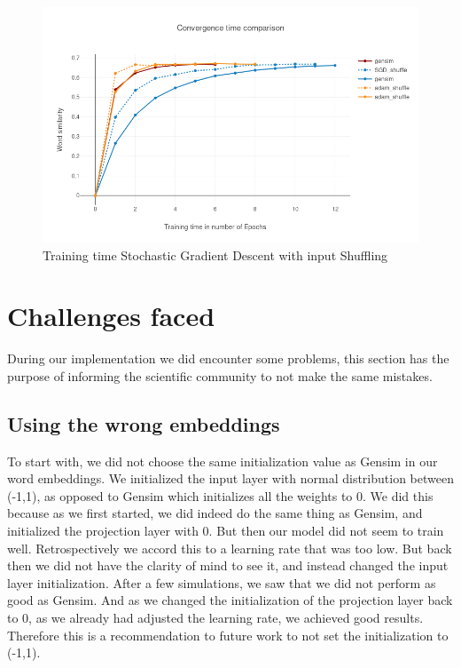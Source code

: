\begin{figure}[H]
    \centering
            \includegraphics[scale=0.45]{images/gensim_vs_adam} 
    \caption{Training time Stochastic Gradient Descent with input Shuffling}
    \label{fig:gensim_vs_adam}
\end{figure}

\section{Challenges faced}
During our implementation we did encounter some problems, this section has the purpose of informing the scientific community to not make the same mistakes. 
\subsection{Using the wrong embeddings}
To start with, we did not choose the same initialization value as Gensim in our word embeddings. We initialized the input layer with normal distribution between (-1,1), as opposed to Gensim which initializes all the weights to 0. We did this because as we first started, we did indeed do the same thing as Gensim, and initialized the projection layer with 0. But then our model did not seem to train well. Retrospectively we accord this to a learning rate that was too low. But back then we did not have the clarity of mind to see it, and instead changed the input layer initialization. After a few simulations, we saw that we did not perform as good as Gensim. And as we changed the initialization of the projection layer back to 0, as we already had adjusted the learning rate, we achieved good results. Therefore this is a recommendation to future work to not set the initialization to (-1,1).

